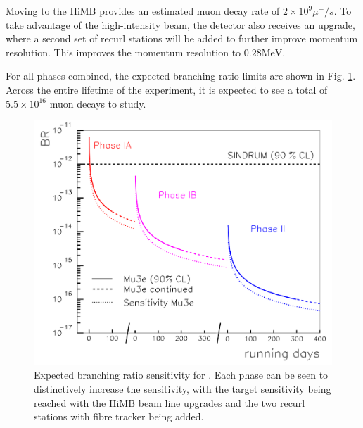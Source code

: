 \noindent Moving to the HiMB provides an estimated muon decay rate of $2 \times 10^9 \mu^+/s$.
To take advantage of the high-intensity beam, the detector also receives an upgrade, where a second set of recurl stations will be added to further improve momentum resolution.
This improves the momentum resolution to $0.28\textrm{MeV}$.

For all phases combined, the expected branching ratio limits are shown in Fig. \ref{fig:mu3e_br_limits}.
Across the entire lifetime of the experiment, it is expected to see a total of $5.5 \times 10^{16}$ muon decays to study.

\begin{figure}[h]
    \centering
    \includegraphics[width = \textwidth]{Figures/experiments/mu3e_br_limits.png}
    \caption{Expected branching ratio sensitivity for \mueee \cite{Blondel:2013ia}.
    Each phase can be seen to distinctively increase the sensitivity, with the target sensitivity being reached with the HiMB beam line upgrades and the two recurl stations with fibre tracker being added.}
    \label{fig:mu3e_br_limits}
\end{figure}
